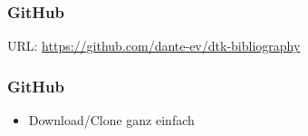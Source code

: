 \documentclass[ngerman]{beamer}
\begin{document}
\begin{frame}
\frametitle{GitHub}

URL: \url{https://github.com/dante-ev/dtk-bibliography}

\begin{center}
\end{center}
\end{frame}

\begin{frame}
\frametitle{GitHub}

\begin{itemize}
	\item Download/Clone ganz einfach
\end{itemize}

\begin{center}
\end{center}
\end{frame}
\end{document}
